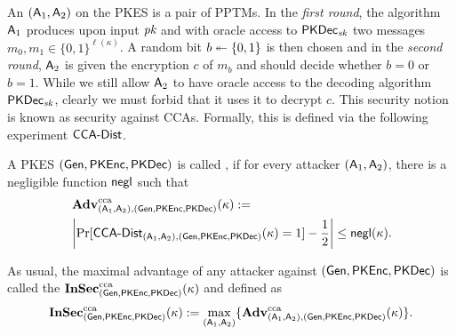 An 
$(\Att_{1},\Att_{2})$ on the \ac{PKES} is a pair of \acp{PPTM}. In the
\emph{first round}, the algorithm $\Att_{1}$ produces upon input $\pk$
and with oracle access to $\PKDec_{\sk}$ two messages $m_{0},m_{1}\in
\{0,1\}^{\ell(\kappa)}$. A random bit $b\sgets \{0,1\}$ is then chosen
and in the \emph{second round}, $\Att_{2}$ is given
the encryption $c$ of $m_{b}$ and should decide whether $b=0$ or
$b=1$. While we still allow $\Att_{2}$ to have oracle access to the
decoding algorithm $\PKDec_{\sk}$, clearly we must forbid that it
uses it to decrypt $c$. 
This security notion is known as security
against \acp{CCA}. Formally, this is defined via the following experiment
$\CCA-Dist$. 



A \ac{PKES} $(\Gen,\PKEnc,\PKDec)$ is called , if for
every attacker $(\Att_{1},\Att_{2})$, there is a negligible function
$\negl$ such that
\begin{align*}
  &\Adv_{(\Att_{1},\Att_{2}),(\Gen,\PKEnc,\PKDec)}^{\cca}(\kappa) :=\\
  &\left|\Pr[\CCA-Dist_{(\Att_{1},\Att_{2}),(\Gen,\PKEnc,\PKDec)}(\kappa)=1]
    - \frac{1}{2}\right|\leq \negl(\kappa).
\end{align*}

As usual, the maximal advantage of any attacker against
$(\Gen,\PKEnc,\PKDec)$ is called the 
$\InSec_{(\Gen,\PKEnc,\PKDec)}^{\cca}(\kappa)$ and defined as
\begin{align*}
  \InSec_{(\Gen,\PKEnc,\PKDec)}^{\cca}(\kappa) := \max_{(\Att_{1},\Att_{2})}\{\Adv^{\cca}_{(\Att_{1},\Att_{2}),(\Gen,\PKEnc,\PKDec)}(\kappa)\}.
\end{align*}

